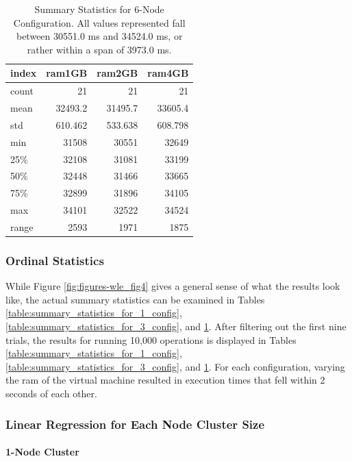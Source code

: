 \begin{table}
\begin{tabular}{lrrr}
\toprule
 index &  ram1GB &  ram2GB &  ram4GB \\
\midrule
 count &      21 &      21 &      21 \\
  mean & 32493.2 & 31495.7 & 33605.4 \\
   std & 610.462 & 533.638 & 608.798 \\
   min &   31508 &   30551 &   32649 \\
   25\% &   32108 &   31081 &   33199 \\
   50\% &   32448 &   31466 &   33665 \\
   75\% &   32899 &   31896 &   34105 \\
   max &   34101 &   32522 &   34524 \\
 range &    2593 &    1971 &    1875 \\
\bottomrule
\end{tabular}
\caption{Summary Statistics for 6-Node Configuration. All values represented fall between 30551.0 ms and 34524.0 ms, or rather within a span of 3973.0 ms.}
\label{table:summary_statistics_for_6_config}
\end{table}

\subsubsection{Ordinal Statistics}

While Figure \ref{fig:figures-wle_fig4} gives a general sense of what the results look like, the actual summary statistics can be examined in Tables \ref{table:summary_statistics_for_1_config}, \ref{table:summary_statistics_for_3_config}, and \ref{table:summary_statistics_for_6_config}. After filtering out the first nine trials, the results for running 10,000 operations is displayed in Tables \ref{table:summary_statistics_for_1_config}, \ref{table:summary_statistics_for_3_config}, and \ref{table:summary_statistics_for_6_config}.  For each configuration, varying the \gls{ram} of the virtual machine resulted in execution times that fell within 2 seconds of each other.

\subsubsection{Linear Regression for Each Node Cluster Size}

\paragraph{1-Node Cluster}
